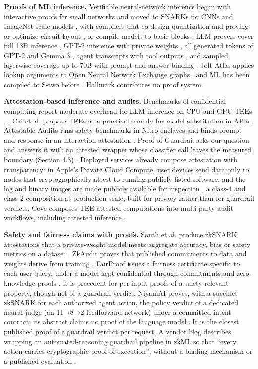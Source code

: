 \documentclass[11pt]{article}
\begin{document}
\textbf{Proofs of ML inference.} Verifiable neural-network inference began with interactive proofs for small networks \cite{A1} and moved to SNARKs for CNNs \cite{A5} and ImageNet-scale models \cite{A7}, with compilers that co-design quantization and proving \cite{A4} or optimize circuit layout \cite{A8}, or compile models to basic blocks \cite{A13}. LLM provers cover full 13B inference \cite{A15}, GPT-2 inference with private weights \cite{A45}, all generated tokens of GPT-2 and Gemma 3 \cite{A17}, agent transcripts with tool outputs \cite{A19}, and sampled layerwise coverage up to 70B with prompt and answer binding \cite{A22}. Jolt Atlas applies lookup arguments to Open Neural Network Exchange graphs \cite{A14}, and ML has been compiled to S-two before \cite{A29}. Hallmark contributes no proof system.

\textbf{Attestation-based inference and audits.} Benchmarks of confidential computing report moderate overhead for LLM inference on CPU and GPU TEEs \cite{B8}, \cite{B10}. Cai et al. propose TEEs as a practical remedy for model substitution in APIs \cite{C15}. Attestable Audits runs safety benchmarks in Nitro enclaves and binds prompt and response in an interaction attestation \cite{B23}. Proof-of-Guardrail asks our question and answers it with an attested wrapper whose classifier call leaves the measured boundary (Section 4.3) \cite{B24}. Deployed services already compose attestation with transparency: in Apple's Private Cloud Compute, user devices send data only to nodes that cryptographically attest to running publicly listed software, and the log and binary images are made publicly available for inspection \cite{B26}, a class-4 and class-2 composition at production scale, built for privacy rather than for guardrail verdicts. Cove composes TEE-attested computations into multi-party audit workflows, including attested inference \cite{B25}.

\textbf{Safety and fairness claims with proofs.} South et al. produce zkSNARK attestations that a private-weight model meets aggregate accuracy, bias or safety metrics on a dataset \cite{A9}. ZkAudit proves that published commitments to data and weights derive from training \cite{D19}. FairProof issues a fairness certificate specific to each user query, under a model kept confidential through commitments and zero-knowledge proofs \cite{F3}. It is precedent for per-input proofs of a safety-relevant property, though not of a guardrail verdict. NiyamAI proves, with a succinct zkSNARK for each authorized agent action, the policy verdict of a dedicated neural judge (an 11→8→2 feedforward network) under a committed intent contract; its abstract claims no proof of the language model \cite{A44}. It is the closest published proof of a guardrail verdict per request. A vendor blog describes wrapping an automated-reasoning guardrail pipeline in zkML so that ``every action carries cryptographic proof of execution'', without a binding mechanism or a published evaluation \cite{E1}.
\end{document}
